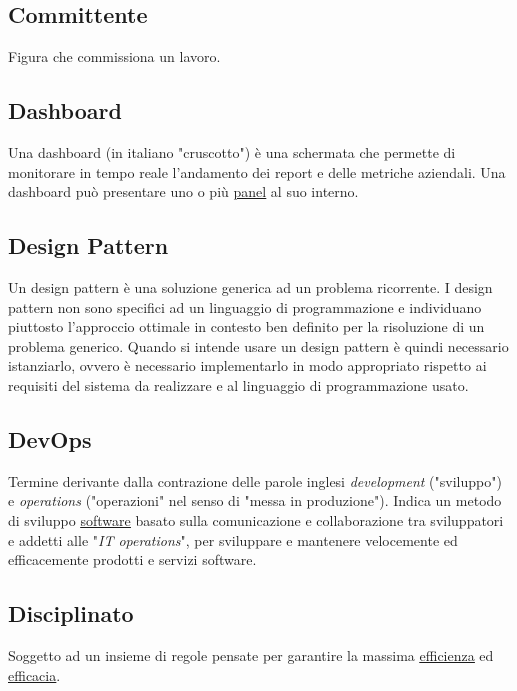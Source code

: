 	\subsection{Committente}
	\label{sec:committente}
	Figura che commissiona un lavoro.

	\newpage

	
	\subsection{Dashboard}
	\label{sec:dashboard}
	Una dashboard (in italiano "cruscotto") è una schermata che permette di monitorare in tempo reale l’andamento dei report e delle metriche aziendali. Una dashboard può presentare uno o più \underline{\hyperref[sec:panel]{panel}} al suo interno.

	
	\subsection{Design Pattern}
	\label{sec:designpatter}
	Un design pattern è una soluzione generica ad un problema ricorrente. I design pattern non sono specifici ad un linguaggio di programmazione e individuano piuttosto l'approccio ottimale in contesto ben definito per la risoluzione di un problema generico. Quando si intende usare un design pattern è quindi necessario istanziarlo, ovvero è necessario implementarlo in modo appropriato rispetto ai requisiti del sistema da realizzare e al linguaggio di programmazione usato.

		
	\subsection{DevOps}
	\label{sec:devops}
	Termine derivante dalla contrazione delle parole inglesi \emph{development} ("sviluppo") e \emph{operations} ("operazioni" nel senso di "messa in produzione"). Indica un metodo di sviluppo \underline{\hyperref[sec:prodottosoftware]{software}} basato sulla comunicazione e collaborazione tra sviluppatori e addetti alle "\emph{IT operations}", per sviluppare e mantenere velocemente ed efficacemente prodotti e servizi software.


	\subsection{Disciplinato}
	\label{sec:disciplinato}
	Soggetto ad un insieme di regole pensate per garantire la massima \underline{\hyperref[sec:efficienza]{efficienza}} ed \underline{\hyperref[sec:efficacia]{efficacia}}.

